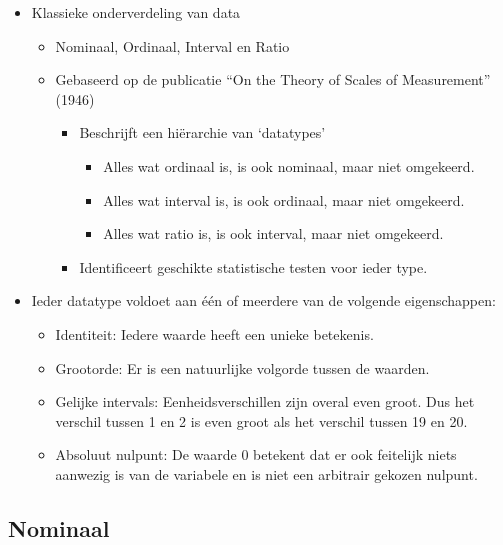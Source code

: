 \documentclass[]{memoir}
\providecommand{\tightlist}{%
  \setlength{\itemsep}{0pt}\setlength{\parskip}{0pt}}
\begin{document}
\begin{itemize}
\tightlist
\item
  Klassieke onderverdeling van data

  \begin{itemize}
  \tightlist
  \item
    Nominaal, Ordinaal, Interval en Ratio
  \item
    Gebaseerd op de publicatie ``On the Theory of Scales of
    Measurement'' (1946)

    \begin{itemize}
    \tightlist
    \item
      Beschrijft een hiërarchie van `datatypes'

      \begin{itemize}
      \tightlist
      \item
        Alles wat ordinaal is, is ook nominaal, maar niet omgekeerd.
      \item
        Alles wat interval is, is ook ordinaal, maar niet omgekeerd.
      \item
        Alles wat ratio is, is ook interval, maar niet omgekeerd.
      \end{itemize}
    \item
      Identificeert geschikte statistische testen voor ieder type.
    \end{itemize}
  \end{itemize}
\item
  Ieder datatype voldoet aan één of meerdere van de volgende
  eigenschappen:

  \begin{itemize}
  \tightlist
  \item
    Identiteit: Iedere waarde heeft een unieke betekenis.
  \item
    Grootorde: Er is een natuurlijke volgorde tussen de waarden.
  \item
    Gelijke intervals: Eenheidsverschillen zijn overal even groot. Dus
    het verschil tussen 1 en 2 is even groot als het verschil tussen 19
    en 20.
  \item
    Absoluut nulpunt: De waarde 0 betekent dat er ook feitelijk niets
    aanwezig is van de variabele en is niet een arbitrair gekozen
    nulpunt.
  \end{itemize}
\end{itemize}

\subsection*{Nominaal}\label{nominaal}
\end{document}
